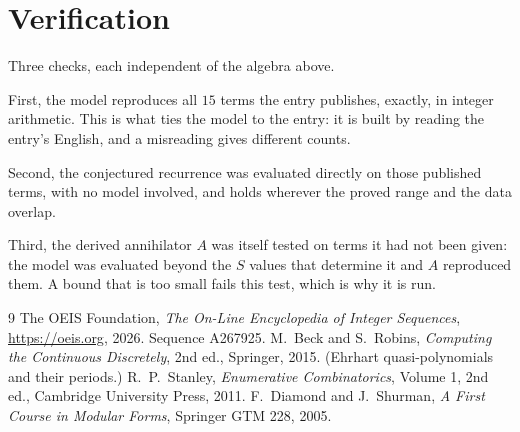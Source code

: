 \documentclass[11pt,a4paper]{article}
\theoremstyle{plain}
\theoremstyle{definition}
\begin{document}
\section{Verification}

Three checks, each independent of the algebra above.

First, the model reproduces all $15$ terms the entry publishes, exactly, in integer
arithmetic. This is what ties the model to the entry: it is built by reading the entry's
English, and a misreading gives different counts.

Second, the conjectured recurrence was evaluated directly on those published terms, with no
model involved, and holds wherever the proved range and the data overlap.

Third, the derived annihilator $A$ was itself tested on terms it had not been given: the model
was evaluated beyond the $S$ values that determine it and $A$ reproduced them. A bound that is
too small fails this test, which is why it is run.

\begin{thebibliography}{9}
 The OEIS Foundation, \emph{The On-Line Encyclopedia of Integer
Sequences}, \url{https://oeis.org}, 2026. Sequence A267925.
 M.~Beck and S.~Robins, \emph{Computing the Continuous Discretely},
2nd ed., Springer, 2015. (Ehrhart quasi-polynomials and their periods.)
 R.~P.~Stanley, \emph{Enumerative Combinatorics}, Volume 1, 2nd ed.,
Cambridge University Press, 2011.
 F.~Diamond and J.~Shurman, \emph{A First Course in Modular Forms},
Springer GTM 228, 2005.
\end{thebibliography}
\end{document}
